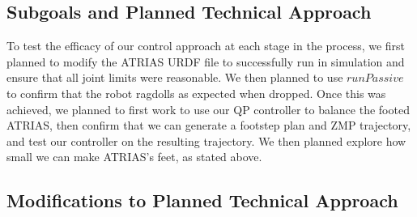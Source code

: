 \documentclass[letterpaper, 10 pt, conference]{ieeeconf}  %
\begin{document}
\subsection{Subgoals and Planned Technical Approach}

To test the efficacy of our control approach at each stage in the process, we first planned to modify the ATRIAS URDF file to successfully run in simulation and ensure that all joint limits were reasonable. We then planned to use $runPassive$ to confirm that the robot ragdolls as expected when dropped. Once this was achieved, we planned to first work to use our QP controller to balance the footed ATRIAS, then confirm that we can generate a footstep plan and ZMP trajectory, and test our controller on the resulting trajectory. We then planned explore how small we can make ATRIAS's feet, as stated above.

\subsection{Modifications to Planned Technical Approach}
\end{document}
